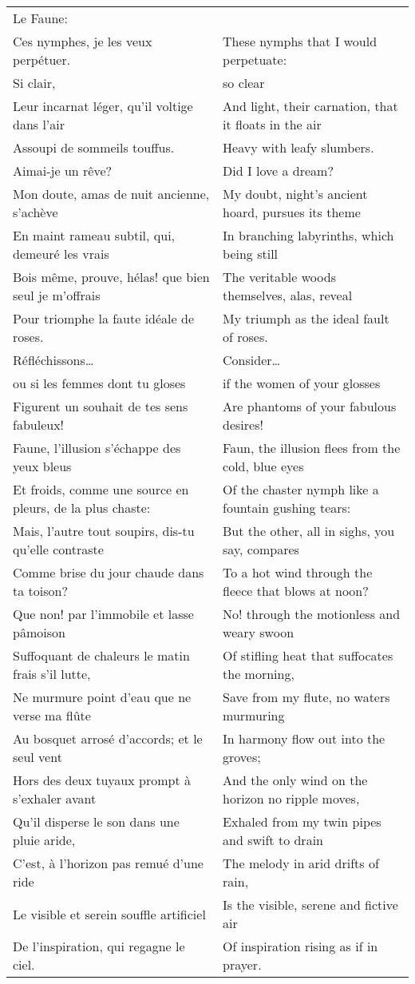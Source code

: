 \begin{table}[h!]
\begin{tabular}{|l|l|} \hline
Le Faune: & \\
Ces nymphes, je les veux perp\'etuer. & These nymphs that I would perpetuate: \\
Si clair, & so clear \\
Leur incarnat l\'eger, qu'il voltige dans l'air & And light, their carnation, that it floats in the air  \\
Assoupi de sommeils touffus. & Heavy with leafy slumbers. \\
Aimai-je un r\^eve? & Did I love a dream? \\
Mon doute, amas de nuit ancienne, s'ach\`eve & My doubt, night’s ancient hoard, pursues its theme \\
En maint rameau subtil, qui, demeur\'e les vrais & In branching labyrinths, which being still \\
Bois m\^eme, prouve, h\'elas! que bien seul je m'offrais & The veritable woods themselves, alas, reveal \\
Pour triomphe la faute id\'eale de roses. & My triumph as the ideal fault of roses. \\
R\'efl\'echissons… & Consider… \\
ou si les femmes dont tu gloses & if the women of your glosses \\
Figurent un souhait de tes sens fabuleux! & Are phantoms of your fabulous desires! \\
Faune, l'illusion s'\'echappe des yeux bleus & Faun, the illusion flees from the cold, blue eyes \\
Et froids, comme une source en pleurs, de la plus chaste: & Of the chaster nymph like a fountain gushing tears: \\
Mais, l'autre tout soupirs, dis-tu qu'elle contraste & But the other, all in sighs, you say, compares \\
Comme brise du jour chaude dans ta toison? & To a hot wind through the fleece that blows at noon? \\
Que non! par l'immobile et lasse p\^amoison & No! through the motionless and weary swoon \\
Suffoquant de chaleurs le matin frais s'il lutte, & Of stifling heat that suffocates the morning, \\
Ne murmure point d'eau que ne verse ma fl\^ute & Save from my flute, no waters murmuring \\
Au bosquet arros\'e d'accords; et le seul vent & In harmony flow out into the groves; \\
Hors des deux tuyaux prompt \`a s'exhaler avant & And the only wind on the horizon no ripple moves, \\
Qu'il disperse le son dans une pluie aride, & Exhaled from my twin pipes and swift to drain \\
C'est, \`a l'horizon pas remu\'e d'une ride & The melody in arid drifts of rain, \\
Le visible et serein souffle artificiel & Is the visible, serene and fictive air \\
De l'inspiration, qui regagne le ciel. & Of inspiration rising as if in prayer. \\


\end{tabular}
\end{table}
